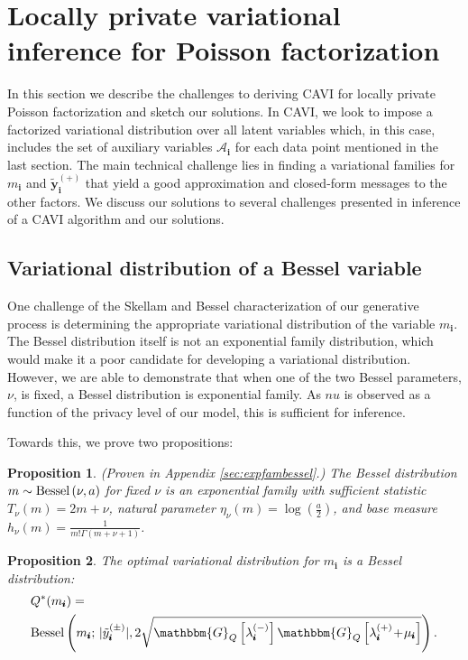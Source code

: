 \documentclass[letterpaper]{article}
\newcommand{\subs}{\pmb{i}}
\newcommand{\wsup}[2]{#1_{\subs}^{(#2)}}
\newcommand{\ytPM}{\wsup{\tilde{y}}{\pm}}
\newcommand{\lamP}{\wsup{\lambda}{+}}
\newcommand{\lamM}{\wsup{\lambda}{-}}
\newcommand{\mus}{\mu_{\subs}}
\newcommand{\ms}{m_{\subs}}
\newcommand{\Bess}[1]{\textup{Bessel}\left( #1 \right)}
\newcommand{\Gq}[1]{\mathbbm{G}_Q\left[#1\right]}
\newcommand{\teq}{\!=\!}
\newcommand{\tp}{\!+\!}
\newcommand{\yvtP}{\boldsymbol{\tilde{y}}_{\subs}^{(+)}}
\newtheorem{proposition}{Proposition}
\begin{document}
  
  \section{Locally private variational inference for Poisson factorization}
  In this section we describe the challenges to deriving CAVI for locally
  private Poisson factorization and sketch our solutions. In CAVI, we look to
  impose a factorized variational distribution over all latent variables which,
  in this case, includes the set of auxiliary variables $\mathcal{A}_{\subs}$
  for each data point mentioned in the last section. The main technical
  challenge lies in finding a variational families for $\ms$ and $\yvtP$ that
  yield a good approximation and closed-form messages to the other factors. We
  discuss our solutions to several challenges presented in inference of a CAVI
  algorithm and our solutions.~
   
  \subsection{Variational distribution of a Bessel variable}
  
  One challenge of the Skellam and Bessel characterization of our generative process
  is determining the appropriate variational distribution of the variable $\ms$. The
  Bessel distribution itself is not an exponential family distribution, which would
  make it a poor candidate for developing a variational distribution. However, we are
  able to demonstrate that when one of the two Bessel parameters, $\nu$, is fixed,
  a Bessel distribution is exponential family. As $nu$ is observed as a function of the
  privacy level of our model, this is sufficient for inference.

  Towards this, we prove two propositions:
  
  \begin{proposition} (Proven in Appendix \ref{sec:expfambessel}.) The Bessel
  distribution $m \sim \Bess{\nu, a}$ for fixed $\nu$ is an exponential family
  with sufficient statistic $T_{\nu}(m) \teq 2m \tp \nu$, natural parameter
  $\eta_{\nu}(m)\teq \log(\frac{a}{2})$, and base measure $h_{\nu}(m) \teq
  \frac{1}{m!\Gamma(m\tp\nu\tp 1)}$. 
  \end{proposition}
  
  \begin{proposition} The optimal variational distribution for $\ms$ is a Bessel
  distribution:
  \begin{align}
  \label{eqn:opt}
  \begin{split}
  &Q^*(\ms) =\\
  &\Bess{\ms; \, |\ytPM|, 2\sqrt{\Gq{\lamM}\Gq{\lamP \tp \mus}}}.
  \end{split}
  \end{align}
  \end{proposition}
  
\end{document}
